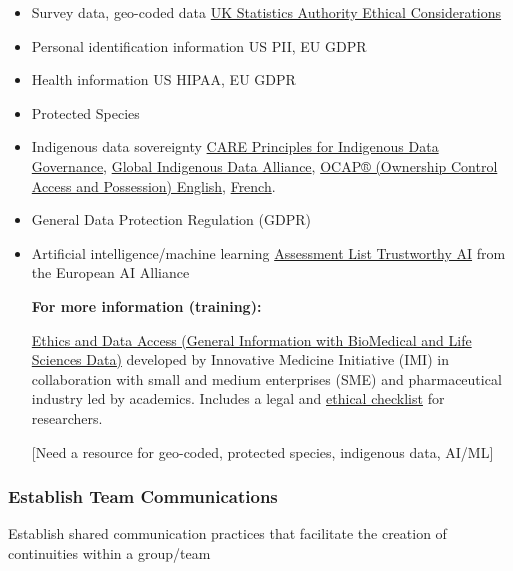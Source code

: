\documentclass[
  letterpaper,
  DIV=11,
  numbers=noendperiod]{scrreport}
\begin{document}
\begin{itemize}
\item
  Survey data, geo-coded data
  \href{https://uksa.statisticsauthority.gov.uk/publication/ethical-considerations-in-the-use-of-geospatial-data-for-research-and-statistics/pages/7/}{UK
  Statistics Authority Ethical Considerations}
\item
  Personal identification information US PII, EU GDPR
\item
  Health information US HIPAA, EU GDPR
\item
  Protected Species
\item
  Indigenous data sovereignty
  \href{http://doi.org/10.5334/dsj-2020-043}{CARE Principles for
  Indigenous Data Governance},
  \href{https://www.gida-global.org/care}{Global Indigenous Data
  Alliance}, \href{https://fnigc.ca/ocap-training/}{OCAP® (Ownership
  Control Access and Possession) English},
  \href{https://fnigc.ca/fr/les-principes-de-pcap-des-premieres-nations/}{French}.
\item
  General Data Protection Regulation (GDPR)
\item
  Artificial intelligence/machine learning
  \href{https://futurium.ec.europa.eu/en/european-ai-alliance/pages/altai-assessment-list-trustworthy-artificial-intelligence}{Assessment
  List Trustworthy AI} from the European AI Alliance

  \textbf{For more information (training):}

  \href{https://ilias.fraunhofer.de/goto.php?target=fold_15177\&client_id=fraunhofer}{Ethics
  and Data Access (General Information with BioMedical and Life Sciences
  Data)} developed by Innovative Medicine Initiative (IMI) in
  collaboration with small and medium enterprises (SME) and
  pharmaceutical industry led by academics. Includes a legal and
  \href{https://ilias.fraunhofer.de/ilias.php?baseClass=ilSAHSPresentationGUI\&ref_id=17285}{ethical
  checklist} for researchers.

  {[}Need a resource for geo-coded, protected species, indigenous data,
  AI/ML{]}
\end{itemize}

\hypertarget{establish-team-communications}{%
\subsubsection{Establish Team
Communications}\label{establish-team-communications}}

Establish shared communication practices that facilitate the creation of
continuities within a group/team
\end{document}
